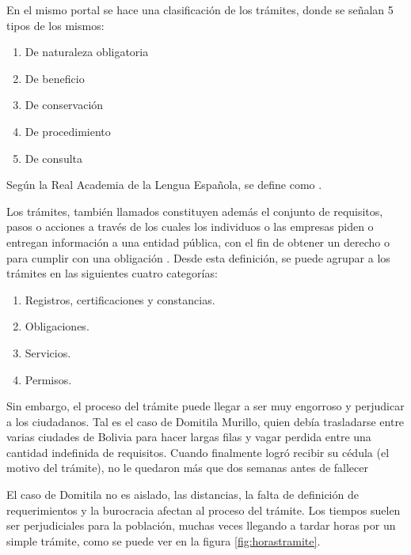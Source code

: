 En el mismo portal se hace una clasificación de los trámites, donde se señalan 5
tipos de los mismos:

\begin{enumerate}
    \item De naturaleza obligatoria
    \item De beneficio
    \item De conservación
    \item De procedimiento
    \item De consulta
\end{enumerate}

Según la Real Academia de la Lengua Española, se define como 
\parencite{asaleDiccionarioLenguaEspanola}.

Los trámites, también llamados  constituyen además el conjunto de requisitos, pasos o acciones a
través de los cuales los individuos o las empresas piden o entregan información
a una entidad pública, con el fin de obtener un derecho o para cumplir con una
obligación \cite[36]{rosethFinTramiteEterno2018}. Desde esta definición, se puede agrupar a los trámites en las siguientes cuatro categorías:

\begin{enumerate}
    \item Registros, certificaciones y constancias.
    \item Obligaciones.
    \item Servicios.
    \item Permisos.
\end{enumerate}

Sin embargo, el proceso del trámite puede llegar a ser muy engorroso y
perjudicar a los ciudadanos. Tal es el caso de Domitila Murillo, quien debía
trasladarse entre varias ciudades de Bolivia para hacer largas filas y vagar
perdida entre una cantidad indefinida de requisitos. Cuando finalmente logró
recibir su cédula (el motivo del trámite), no le quedaron más que dos semanas
antes de fallecer \cite{charoskyQuejaComoEnergia2014}

El caso de Domitila no es aislado, las distancias, la falta de definición de
requerimientos y la burocracia afectan al proceso del trámite. Los tiempos
suelen ser perjudiciales para la población, muchas veces llegando a tardar horas
por un simple trámite, como se puede ver en la figura \ref{fig:horastramite}.

